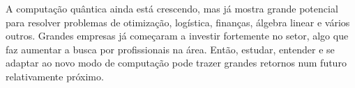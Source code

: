 A computação quântica ainda está crescendo, mas já mostra grande potencial para resolver problemas de otimização, logística, finanças, álgebra linear e vários outros.
Grandes empresas já começaram a investir fortemente no setor, algo que faz aumentar a busca por profissionais na área.
Então, estudar, entender e se adaptar ao novo modo de computação pode trazer grandes retornos num futuro relativamente próximo.